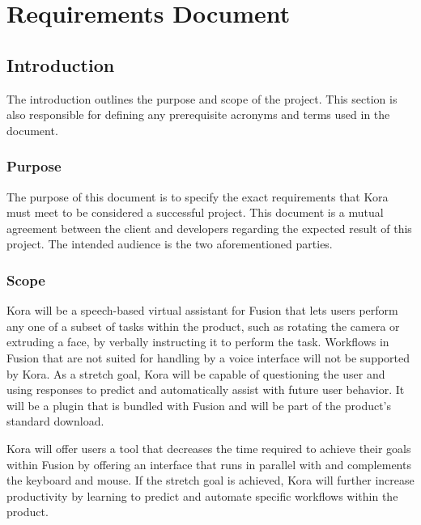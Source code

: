 \documentclass[onecolumn, draftclsnofoot,10pt, compsoc]{IEEEtran}
\def \botname{Kora\xspace}
\begin{document}
\section{Requirements Document}

	\subsection{Introduction}
	The introduction outlines the purpose and scope of the project.
	This section is also responsible for defining any prerequisite acronyms and terms used in the document.
	\subsubsection{Purpose}
	The purpose of this document is to specify the exact requirements that \botname must meet to be considered a successful project.
	This document is a mutual agreement between the client and developers regarding the expected result of this project.
	The intended audience is the two aforementioned parties.
	\subsubsection{Scope}
	\botname will be a speech-based virtual assistant for Fusion that lets users perform any one of a subset of tasks within the product, such as rotating the camera or extruding a face, by verbally instructing it to perform the task.
	Workflows in Fusion that are not suited for handling by a voice interface will not be supported by \botname.
	As a stretch goal, \botname will be capable of questioning the user and using responses to predict and automatically assist with future user behavior.
	It will be a plugin that is bundled with Fusion and will be part of the product's standard download.

	\botname will offer users a tool that decreases the time required to achieve their goals within Fusion by offering an interface that runs in parallel with and complements the keyboard and mouse.
	If the stretch goal is achieved, \botname will further increase productivity by learning to predict and automate specific workflows within the product.
\end{document}
